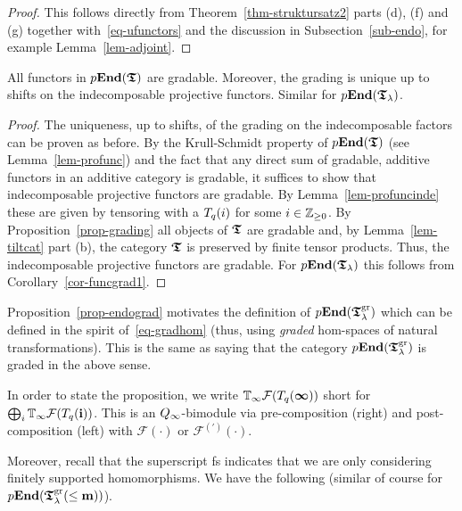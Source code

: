 \begin{proof}
This follows directly from 
Theorem~\ref{thm-struktursatz2} 
parts (d), (f) and (g) together 
with~\eqref{eq-ufunctors} and the 
discussion in Subsection~\ref{sub-endo}, for example Lemma~\ref{lem-adjoint}.
\end{proof}



\begin{prop}\label{prop-endograd}
All functors in $p\boldsymbol{\mathrm{End}}(\boldsymbol{\mathfrak{T}})$ are gradable. 
Moreover, the grading is unique up to shifts 
on the indecomposable projective functors. 
Similar for $p\boldsymbol{\mathrm{End}}(\boldsymbol{\mathfrak{T}}_{\lambda})$.\makeqed
\end{prop}



\begin{proof}
The uniqueness, up to shifts, of the grading on the indecomposable 
factors can be proven as before. By the Krull-Schmidt property of $p\boldsymbol{\mathrm{End}}(\boldsymbol{\mathfrak{T}})$ 
(see Lemma~\ref{lem-profunc}) and the fact that any direct sum of gradable, 
additive functors in an additive category is 
gradable, it suffices to show that indecomposable 
projective functors are gradable. By 
Lemma~\ref{lem-profuncinde} these are given 
by tensoring with a $T_q({i})$ for some $i\in\mathbb{Z}_{\geq 0}$. 
By Proposition~\ref{prop-grading} all objects 
of $\boldsymbol{\mathfrak{T}}$ are gradable and, by Lemma~\ref{lem-tiltcat} 
part (b), the category $\boldsymbol{\mathfrak{T}}$ is preserved by finite 
tensor products. Thus, the indecomposable projective functors are gradable. 
For 
$p\boldsymbol{\mathrm{End}}(\boldsymbol{\mathfrak{T}}_{\lambda})$ this follows from Corollary~\ref{cor-funcgrad1}.
\end{proof}



Proposition~\ref{prop-endograd} motivates 
the definition of $p\boldsymbol{\mathrm{End}}(\boldsymbol{\mathfrak{T}}_{\lambda}^{\mathrm{gr}})$ which can be 
defined in the spirit of~\eqref{eq-gradhom} (thus, using 
\textit{graded} hom-spaces of natural 
transformations). This is the same as 
saying that the category $p\boldsymbol{\mathrm{End}}(\boldsymbol{\mathfrak{T}}_{\lambda}^{\mathrm{gr}})$ is graded in the above sense.



In order to state the proposition, we write 
$\mathbb{T}_{\infty}\mathcal F(T_q({\boldsymbol{\infty}}))$ short for 
$\bigoplus_i\mathbb{T}_{\infty}\mathcal F(T_q({\boldsymbol{\mathrm{i}}}))$. This 
is an $Q_{\infty}$-bimodule via pre-composition 
(right) and post-composition (left) with 
$\mathcal F(\cdot)$ or $\mathcal F^{(\prime)}(\cdot)$.



Moreover, recall that the superscript fs 
indicates that we are only considering finitely 
supported homomorphisms. We have the following 
(similar of course for $p\boldsymbol{\mathrm{End}}(\boldsymbol{\mathfrak{T}}^{\mathrm{gr}}_{\lambda}(\leq\boldsymbol{\mathrm{m}}))$).



